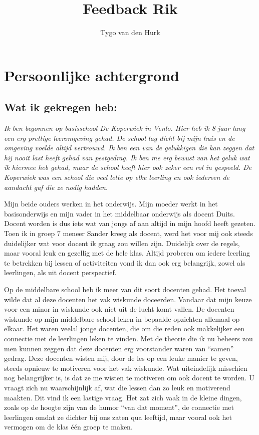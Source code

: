 \documentclass{article}
\begin{document}
    \title{Feedback Rik}
    \author{Tygo van den Hurk}
    \maketitle
    \thispagestyle{empty}
    \newpage   
    \setcounter{page}{1}
    
    \section*{Persoonlijke achtergrond}
        \subsection*{Wat ik gekregen heb:}
            {\itshape      
                Ik ben begonnen op basisschool De Koperwiek in Venlo. Hier heb ik 8 jaar lang een erg prettige leeromgeving gehad. De school lag dicht bij mijn huis en de omgeving voelde altijd vertrouwd. Ik ben een van de gelukkigen die kan zeggen dat hij nooit last heeft gehad van pestgedrag. Ik ben me erg bewust van het geluk wat ik hiermee heb gehad, maar de school heeft hier ook zeker een rol in gespeeld. De Koperwiek was een school die veel lette op elke leerling en ook iedereen de aandacht gaf die ze nodig hadden. 
                
                Mijn beide ouders werken in het onderwijs. Mijn moeder werkt in het basisonderwijs en mijn vader in het middelbaar onderwijs als docent Duits. Docent worden is dus iets wat van jongs af aan altijd in mijn hoofd heeft gezeten. Toen ik in groep 7 meneer Sander kreeg als docent, werd het voor mij ook steeds duidelijker wat voor docent ik graag zou willen zijn. Duidelijk over de regels, maar vooral leuk en gezellig met de hele klas. Altijd proberen om iedere leerling te betrekken bij lessen of activiteiten vond ik dan ook erg belangrijk, zowel als leerlingen, als uit docent perspectief. 
                
                Op de middelbare school heb ik meer van dit soort docenten gehad. Het toeval wilde dat al deze docenten het vak wiskunde doceerden. Vandaar dat mijn keuze voor een minor in wiskunde ook niet uit de lucht komt vallen. De docenten wiskunde op mijn middelbare school leken in bepaalde opzichten allemaal op elkaar. Het waren veelal jonge docenten, die om die reden ook makkelijker een connectie met de leerlingen leken te vinden. Met de theorie die ik nu beheers zou men kunnen zeggen dat deze docenten erg voorstander waren van “samen” gedrag. Deze docenten wisten mij, door de les op een leuke manier te geven, steeds opnieuw te motiveren voor het vak wiskunde. Wat uiteindelijk misschien nog belangrijker is, is dat ze me wisten te motiveren om ook docent te worden. U vraagt zich nu waarschijnlijk af, wat die lessen dan zo leuk en motiverend maakten. Dit vind ik een lastige vraag. Het zat zich vaak in de kleine dingen, zoals op de hoogte zijn van de humor “van dat moment”, de connectie met leerlingen omdat ze dichter bij ons zaten qua leeftijd, maar vooral ook het vermogen om de klas één groep te maken. 
                
}
\end{document}
